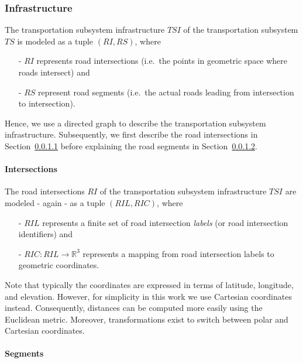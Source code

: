 \subsubsection{Infrastructure}
\label{transport_infrastructure}

The transportation subsystem infrastructure $TSI$ of the transportation subsystem $TS$ is modeled as a tuple $(RI, RS)$, where
\begin{itemize}
	\item[-] $RI$ represents road intersections (i.e.\ the points in geometric space where roads intersect) and
	\item[-] $RS$ represent road segments (i.e.\ the actual roads leading from intersection to intersection).
\end{itemize}
Hence, we use a directed graph to describe the transportation subsystem infrastructure. Subsequently, we first describe the road intersections in Section~\ref{intersections} before explaining the road segments in Section~\ref{segments}.

\paragraph{Intersections}
\label{intersections}

The road intersections $RI$ of the transportation subsystem infrastructure $TSI$ are modeled - again - as a tuple $(RIL, RIC)$, where
\begin{itemize}
	\item[-] $RIL$ represents a finite set of road intersection \textit{labels} (or road intersection identifiers) and
	\item[-] $RIC: RIL \rightarrow \mathbb{R}^3$ represents a mapping from road intersection labels to geometric coordinates.
\end{itemize}
Note that typically the coordinates are expressed in terms of latitude, longitude, and elevation. However, for simplicity in this work we use Cartesian coordinates instead. Consequently, distances can be computed more easily using the Euclidean metric. Moreover, transformations exist to switch between polar and Cartesian coordinates.

\paragraph{Segments}
\label{segments}

